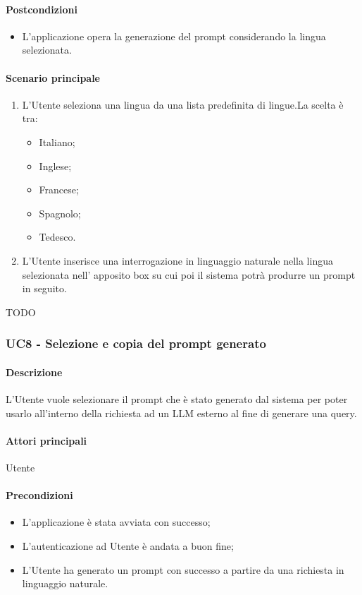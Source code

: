 \paragraph*{Postcondizioni}
\begin{itemize}
  \item L'applicazione opera la generazione del prompt considerando la lingua selezionata.
\end{itemize}

\paragraph*{Scenario principale}
\begin{enumerate}
  \item L’Utente seleziona una lingua da una lista predefinita di lingue.La scelta è tra:
    \begin{itemize}
      \item Italiano;
      \item Inglese;
      \item Francese;
      \item Spagnolo;
      \item Tedesco.
    \end{itemize}
  \item L’Utente inserisce una interrogazione in linguaggio naturale nella lingua selezionata nell’ apposito box su cui poi il sistema potrà produrre un prompt in seguito. 
\end{enumerate}

TODO


\subsubsection{UC8 - Selezione e copia del prompt generato}\label{UC8}

\paragraph*{Descrizione}
L’Utente vuole selezionare il prompt che è stato generato dal sistema per poter usarlo all’interno della richiesta ad un LLM esterno al fine di generare una query.

\paragraph*{Attori principali} Utente

\paragraph*{Precondizioni}
\begin{itemize}
  \item L'applicazione è stata avviata con successo;
  \item L’autenticazione ad Utente è andata a buon fine;
  \item L’Utente ha generato un prompt con successo a partire da una richiesta in linguaggio naturale.  
\end{itemize}


